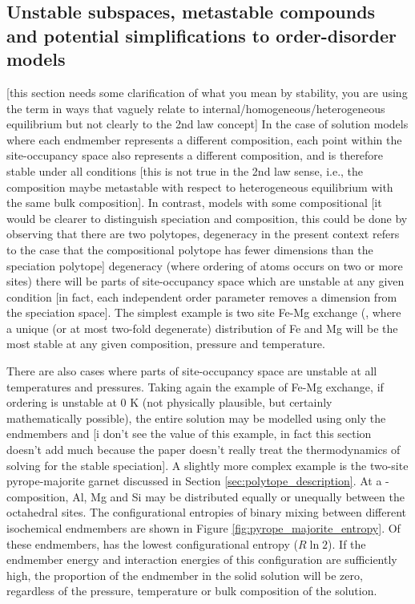 \documentclass[preprint,12pt]{elsarticle}
\begin{document}
\subsection{Unstable subspaces, metastable compounds and potential simplifications to order-disorder models}
\label{sec:relative_stability}
[this section needs some clarification of what you mean by stability, you are using the term in ways that vaguely relate to internal/homogeneous/heterogeneous equilibrium but not clearly to the 2nd law concept]
In the case of solution models where each endmember represents a different composition, each point within the site-occupancy space also represents a different composition, and is therefore stable under all conditions [this is not true in the 2nd law sense, i.e., the composition maybe metastable with respect to heterogeneous equilibrium with the same bulk composition]. In contrast, models with some compositional [it would be clearer to distinguish speciation and composition, this could be done by observing that there are two polytopes, degeneracy in the present context refers to the case that the compositional polytope has fewer dimensions than the speciation polytope] degeneracy (where ordering of atoms occurs on two or more sites) there will be parts of site-occupancy space which are unstable at any given condition [in fact, each independent order parameter removes a dimension from the speciation space]. The simplest example is two site Fe-Mg exchange (\ce{[Fe,Mg][Fe,Mg]}, where a unique (or at most two-fold degenerate) distribution of Fe and Mg will be the most stable at any given composition, pressure and temperature.

There are also cases where parts of site-occupancy space are unstable at all temperatures and pressures. Taking again the example of Fe-Mg exchange, if ordering is unstable at 0 K (not physically plausible, but certainly mathematically possible), the entire solution may be modelled using only the endmembers \ce{[Mg][Mg]} and \ce{[Fe][Fe]} [i don't see the value of this example, in fact this section doesn't add much because the paper doesn't really treat the thermodynamics of solving for the stable speciation]. A slightly more complex example is the two-site pyrope-majorite garnet discussed in Section \ref{sec:polytope_description}. At a -composition, Al, Mg and Si may be distributed equally or unequally between the octahedral sites. The configurational entropies of binary mixing between different isochemical endmembers are shown in Figure \ref{fig:pyrope_majorite_entropy}. Of these endmembers,  has the lowest configurational entropy ($R \ln 2$). If the endmember energy and interaction energies of this configuration are sufficiently high, the proportion of the endmember in the solid solution will be zero, regardless of the pressure, temperature or bulk composition of the solution.
\end{document}
